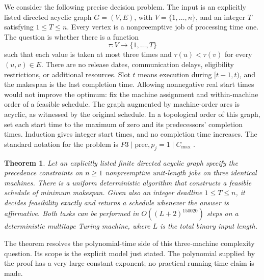 \documentclass[11pt]{article}
\numberwithin{equation}{section}
\newtheorem{theorem}{Theorem}[section]
\theoremstyle{definition}
\theoremstyle{remark}
\begin{document}
We consider the following precise decision problem. The input is an
explicitly listed directed acyclic graph \(G=(V,E)\), with
\(V=\{1,\ldots,n\}\), and an integer \(T\) satisfying \(1\le T\le n\).
Every vertex is a nonpreemptive job of processing time one. The question
is whether there is a function
\[
 \tau:V\longrightarrow\{1,\ldots,T\}
\]
such that each value is taken at most three times and
\(\tau(u)<\tau(v)\) for every \((u,v)\in E\).
There are no release dates, communication delays, eligibility restrictions,
or additional resources.
Slot \(t\) means execution during \([t-1,t)\), and the makespan is
the last completion time. Allowing nonnegative real start times would
not improve the optimum: fix the machine assignment and within-machine
order of a feasible schedule. The graph augmented by machine-order arcs
is acyclic, as witnessed by the original schedule. In a topological order
of this graph, set each start time to the maximum of zero and its
predecessors' completion times. Induction gives integer start times,
and no completion time increases.
The standard notation for the problem is
\(P3\mid\mathrm{prec},p_j=1\mid C_{\max}\)
\citep{GrahamLawlerLenstraRinnooyKan1979}.

\begin{samepage}
\begin{theorem}\label{thm:main}
Let an explicitly listed finite directed acyclic graph specify the
precedence constraints on \(n\ge1\) nonpreemptive unit-length jobs
on three identical machines. There is a uniform deterministic algorithm
that constructs a feasible schedule of minimum makespan.
Given also an integer deadline \(1\le T\le n\), it decides feasibility
exactly and returns a schedule whenever the answer is affirmative.
Both tasks can be performed in
\(O((L+2)^{150020})\) steps on a deterministic multitape Turing machine,
where \(L\) is the total binary input length.
\end{theorem}
\end{samepage}

The theorem resolves the polynomial-time side of this three-machine
complexity question. Its scope is the explicit model just stated.
The polynomial supplied by the proof has a very large constant exponent;
no practical running-time claim is made.
\end{document}
